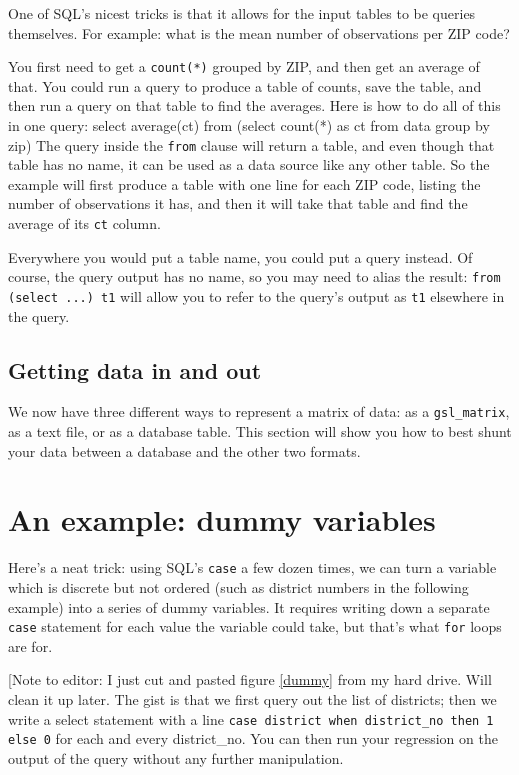 One of SQL's nicest tricks is that it allows for the input tables to be
queries themselves. For example: what is the mean number of observations per
ZIP code?

You first need to get a {\tt count(*)} grouped by ZIP, and then get an
average of that. You could run a query to produce a table of counts,
save the table, and then run a query on that table to find the averages.
Here is how to do all of this in one query: 
select average(ct) 
   from (select count(*) as ct
            from data
            group by zip)
The query inside the {\tt from} clause will return a table, and even
though that table has no name, it can be used as a data source like any other
table. So the example will first produce a table with one line for each
ZIP code, listing the number of observations it has, and then it will
take that table and find the average of its {\tt ct} column.

Everywhere you would put a table name, you could put a query 
instead. Of course, the query output has no name, so you may need to
alias the result: {\tt from (select ...) t1} will allow you to refer to
the query's output as {\tt t1} elsewhere in the query.


\subsection{Getting data in and out}
We now have three different ways to represent a matrix of data: as a {\tt gsl\_matrix}, as a text file,
or as a database table. This section will show you how to best shunt your data between a database and
the other two formats.

\section{An example: dummy variables}
Here's a neat trick: using SQL's {\tt case} a few dozen times, we can turn a
variable which is discrete but not ordered (such as district numbers in the
following example) into a series of dummy variables. It requires writing down a
separate {\tt case} statement for each value the variable could take, but that's
what {\tt for} loops are for.


[Note to editor: I just cut and pasted figure \ref{dummy} from my hard drive. Will clean it up
later. The gist is that we first query out the list of districts; then we write a
select statement with a line {\tt case district when district\_no then 1 else 0} for
each and every district\_no. You can then run your regression on the output of the
query without any further manipulation.

